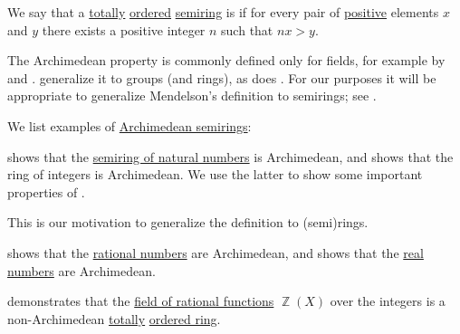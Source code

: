 \begin{definition}\label{def:archimedean_semiring}\mimprovised
  We say that a \hyperref[def:totally_ordered_set]{totally} \hyperref[def:ordered_semiring]{ordered} \hyperref[def:semiring]{semiring} is  if for every pair of \hyperref[def:ordered_semiring_positivity]{positive} elements \( x \) and \( y \) there exists a positive integer \( n \) such that \( nx > y \).
\end{definition}
\begin{comments}
  \item The Archimedean property is commonly defined only for fields, for example by  and .  generalize it to groups (and rings), as does . For our purposes it will be appropriate to generalize Mendelson's definition to semirings; see .
\end{comments}

\begin{example}\label{ex:def:archimedean_semiring}
  We list examples of \hyperref[def:archimedean_semiring]{Archimedean semirings}:
  \begin{thmenum}
      shows that the \hyperref[def:natural_numbers]{semiring of natural numbers} is Archimedean, and  shows that the ring of integers is Archimedean. We use the latter to show some important properties of .

    This is our motivation to generalize the definition to (semi)rings.

      shows that the \hyperref[def:rational_numbers]{rational numbers} are Archimedean, and  shows that the \hyperref[def:real_numbers]{real numbers} are Archimedean.

      demonstrates that the \hyperref[def:rational_function_field]{field of rational functions} \( \BbbZ(X) \) over the integers is a non-Archimedean \hyperref[def:totally_ordered_set]{totally} \hyperref[def:ordered_semiring]{ordered ring}.
  \end{thmenum}
\end{example}

